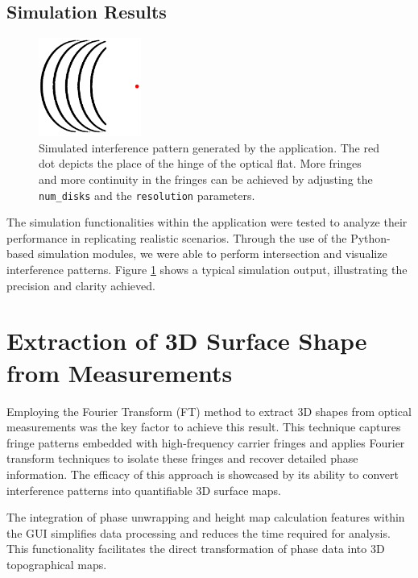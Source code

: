 \documentclass[../main.tex]{subfiles}
\begin{document}
\subsection{Simulation Results}
\begin{minipage}{\textwidth}
\begin{figure}
    \centering
    \vspace{-0.8cm}
    \includegraphics[width=0.3\textwidth]{Images/Results/optical_flat_visualization4}
    \caption{Simulated interference pattern generated by the application. The red dot depicts the place of the hinge of the optical flat. More fringes and more continuity in the fringes can be achieved by adjusting the \texttt{num\_disks} and the \texttt{resolution} parameters.}
    \label{fig:interference}
\end{figure}
The simulation functionalities within the application were tested to analyze their performance in replicating realistic scenarios. Through the use of the Python-based simulation modules, we were able to perform intersection and visualize interference patterns. Figure \ref{fig:interference} shows a typical simulation output, illustrating the precision and clarity achieved.
\section{Extraction of 3D Surface Shape from Measurements}
Employing the Fourier Transform (FT) method to extract 3D shapes from optical measurements was the key factor to achieve this result. This technique captures fringe patterns embedded with high-frequency carrier fringes and applies Fourier transform techniques to isolate these fringes and recover detailed phase information. The efficacy of this approach is showcased by its ability to convert interference patterns into quantifiable 3D surface maps.

The integration of phase unwrapping and height map calculation features within the GUI simplifies data processing and reduces the time required for analysis. This functionality facilitates the direct transformation of phase data into 3D topographical maps.
\end{minipage}
\end{document}
